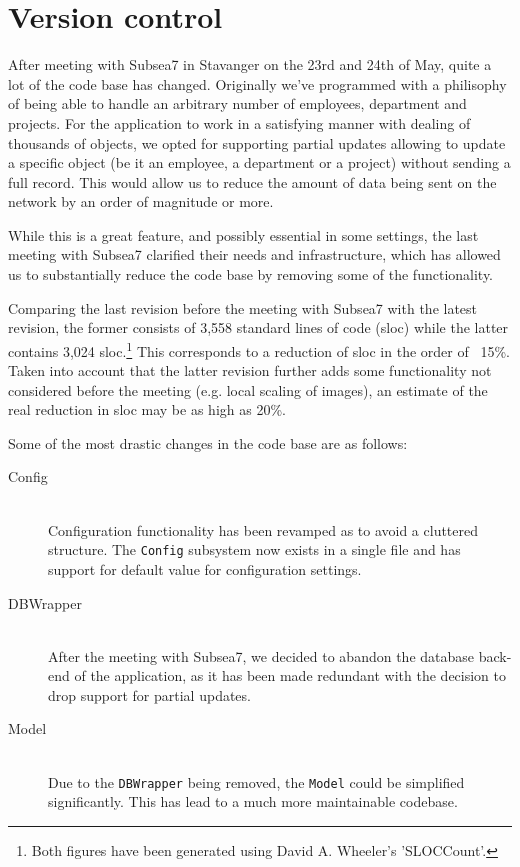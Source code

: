 \section{Version control}
\label{sec:version_control}
After meeting with Subsea7 in Stavanger on the 23rd and 24th of May,
quite a lot of the code base has changed. Originally we've programmed
with a philisophy of being able to handle an arbitrary number of
employees, department and projects. For the application to work in a
satisfying manner with dealing of thousands of objects, we opted for
supporting partial updates allowing to update a specific object (be it
an employee, a department or a project) without sending a full
record. This would allow us to reduce the amount of data being sent on
the network by an order of magnitude or more.

While this is a great feature, and possibly essential in some
settings, the last meeting with Subsea7 clarified their needs and
infrastructure, which has allowed us to substantially reduce the code
base by removing some of the functionality.

Comparing the last revision before the meeting with Subsea7 with the
latest revision, the former consists of 3,558 standard lines of code (sloc)
while the latter contains 3,024 sloc.\footnote{Both figures have been generated using
  David A. Wheeler's 'SLOCCount'.}  This corresponds to a reduction of
sloc in the order of ~15\%. Taken into account that the latter
revision further adds some functionality not considered before the
meeting (e.g. local scaling of images), an estimate of the real
reduction in sloc may be as high as 20\%.

Some of the most drastic changes in the code base are as follows:

\begin{description}

    \item[Config] \hfill \\
        Configuration functionality has been revamped as to avoid a cluttered
        structure. The \texttt{Config} subsystem now exists in a single file and has
        support for default value for configuration settings.

    \item[DBWrapper] \hfill \\
        After the meeting with Subsea7, we decided to abandon the database
        back-end of the application, as it has been made redundant with the
        decision to drop support for partial updates.

    \item[Model] \hfill \\
        Due to the \texttt{DBWrapper} being removed, the \texttt{Model} could
        be simplified significantly. This has lead to a much more maintainable
        codebase.

\end{description}
